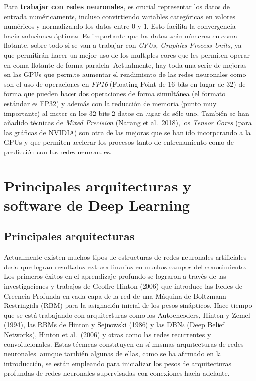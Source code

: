 \documentclass[
  a4paper,
  DIV=11,
  numbers=noendperiod]{scrreprt}
\begin{document}
Para \textbf{trabajar con redes neuronales}, es crucial representar los
datos de entrada numéricamente, incluso convirtiendo variables
categóricas en valores numéricos y normalizando los datos entre 0 y 1.
Esto facilita la convergencia hacia soluciones óptimas. Es importante
que los datos seán números en coma flotante, sobre todo si se van a
trabajar con \emph{GPUs, Graphics Process Units}, ya que permitirán
hacer un mejor uso de los multiples cores que les permiten operar en
coma flotante de forma paralela. Actualmente, hay toda una serie de
mejoras en las GPUs que permite aumentar el rendimiento de las redes
neuronales como son el uso de operaciones en \emph{FP16} (Floating Point
de 16 bits en lugar de 32) de forma que pueden hacer dos operaciones de
forma simultánea (el formato estándar es FP32) y además con la reducción
de memoria (punto muy importante) al meter en los 32 bits 2 datos en
lugar de sólo uno. También se han añadido técnicas de \emph{Mixed
Precision} (Narang et al.~2018), los \emph{Tensor Cores} (para las
gráficas de NVIDIA) son otra de las mejoras que se han ido incorporando
a la GPUs y que permiten acelerar los procesos tanto de entrenamiento
como de predicción con las redes neuronales.

\section{Principales arquitecturas y software de Deep
Learning}\label{principales-arquitecturas-y-software-de-deep-learning}

\subsection{Principales arquitecturas}\label{principales-arquitecturas}

Actualmente existen muchos tipos de estructuras de redes neuronales
artificiales dado que logran resultados extraordinarios en muchos campos
del conocimiento. Los primeros éxitos en el aprendizaje profundo se
lograron a través de las investigaciones y trabajos de Geoffre Hinton
(2006) que introduce las Redes de Creencia Profunda en cada capa de la
red de una Máquina de Boltzmann Restringida (RBM) para la asignación
inicial de los pesos sinápticos. Hace tiempo que se está trabajando con
arquitecturas como los Autoencoders, Hinton y Zemel (1994), las RBMs de
Hinton y Sejnowski (1986) y las DBNs (Deep Belief Networks), Hinton et
al.~(2006) y otras como las redes recurrentes y convolucionales. Estas
técnicas constituyen en sí mismas arquitecturas de redes neuronales,
aunque también algunas de ellas, como se ha afirmado en la introducción,
se están empleando para inicializar los pesos de arquitecturas profundas
de redes neuronales supervisadas con conexiones hacia adelante.
\end{document}
